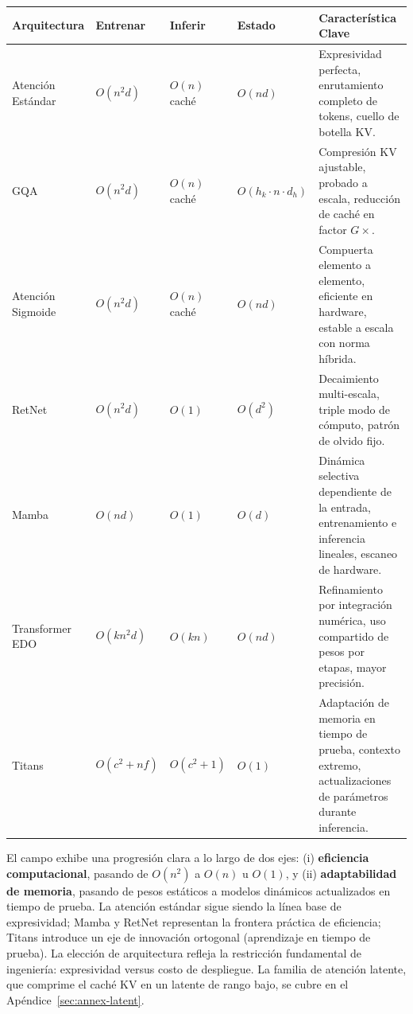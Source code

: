 \small
\begin{longtable}{p{2.0cm}p{1.8cm}p{1.6cm}p{1.6cm}p{4.5cm}}
\toprule
\textbf{Arquitectura} & \textbf{Entrenar} & \textbf{Inferir} & \textbf{Estado} & \textbf{Característica Clave} \\
\midrule
\endhead
Atención Estándar & $O(n^2 d)$ & $O(n)$ caché & $O(nd)$ & Expresividad perfecta, enrutamiento completo de tokens, cuello de botella KV. \\
GQA & $O(n^2 d)$ & $O(n)$ caché & $O(h_k \cdot n \cdot d_h)$ & Compresión KV ajustable, probado a escala, reducción de caché en factor $G \times$. \\
Atención Sigmoide & $O(n^2 d)$ & $O(n)$ caché & $O(nd)$ & Compuerta elemento a elemento, eficiente en hardware, estable a escala con norma híbrida. \\
RetNet & $O(n^2 d)$ & $O(1)$ & $O(d^2)$ & Decaimiento multi-escala, triple modo de cómputo, patrón de olvido fijo. \\
Mamba & $O(nd)$ & $O(1)$ & $O(d)$ & Dinámica selectiva dependiente de la entrada, entrenamiento e inferencia lineales, escaneo de hardware. \\
Transformer EDO & $O(kn^2 d)$ & $O(kn)$ & $O(nd)$ & Refinamiento por integración numérica, uso compartido de pesos por etapas, mayor precisión. \\
Titans & $O(c^2 + nf)$ & $O(c^2 + 1)$ & $O(1)$ & Adaptación de memoria en tiempo de prueba, contexto extremo, actualizaciones de parámetros durante inferencia. \\
\bottomrule
\end{longtable}
\normalsize

El campo exhibe una progresión clara a lo largo de dos ejes: (i) \textbf{eficiencia computacional}, pasando de $O(n^2)$ a $O(n)$ u $O(1)$, y (ii) \textbf{adaptabilidad de memoria}, pasando de pesos estáticos a modelos dinámicos actualizados en tiempo de prueba. La atención estándar sigue siendo la línea base de expresividad; Mamba y RetNet representan la frontera práctica de eficiencia; Titans introduce un eje de innovación ortogonal (aprendizaje en tiempo de prueba). La elección de arquitectura refleja la restricción fundamental de ingeniería: expresividad versus costo de despliegue. La familia de atención latente, que comprime el caché KV en un latente de rango bajo, se cubre en el Apéndice~\ref{sec:annex-latent}.